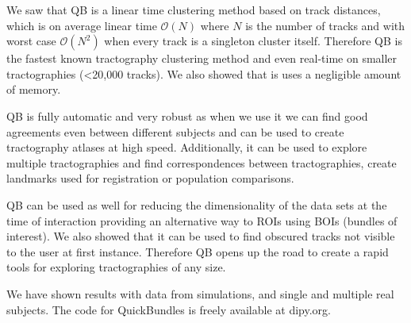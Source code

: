\documentclass[journal]{IEEEtran}
\begin{document}
We saw that QB is a linear time clustering method based on track
distances, which is on average linear time $\mathcal{O}(N)$ where $N$ is
the number of tracks and with worst case $\mathcal{O}(N^{2})$ when every
track is a singleton cluster itself. Therefore QB is the fastest known
tractography clustering method and even real-time on smaller
tractographies (<20,000 tracks). We also showed that is uses a negligible amount of
memory.

QB is fully automatic and very robust as when we use it we can find good
agreements even between different subjects and can be used to create
tractography atlases at high speed. Additionally, it can be used to
explore multiple tractographies and find correspondences between
tractographies, create landmarks used for registration or population
comparisons.

QB can be used as well for reducing the dimensionality of the data sets
at the time of interaction providing an alternative way to ROIs using
BOIs (bundles of interest). We also showed
that it can be used to find obscured tracks not visible to the user
at first instance. Therefore QB opens up the road to create a rapid
tools for exploring tractographies of any size.

We have shown results with data from simulations, and single and
multiple real subjects. The code for QuickBundles is freely available at
dipy.org.


%

%
%


\appendices
{}


\end{document}
